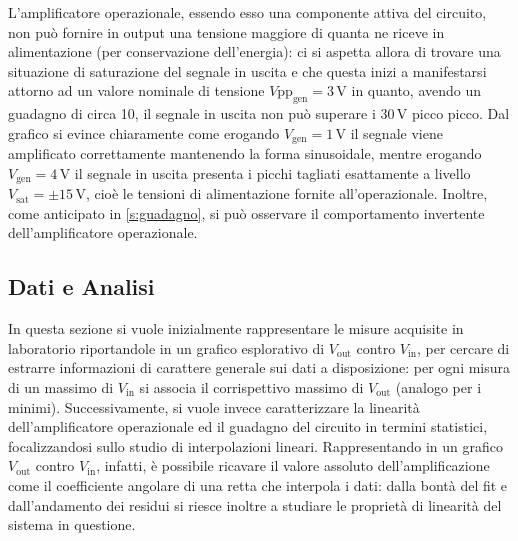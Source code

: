 \documentclass[a4paper,11pt]{article} %
\begin{document}
\noindent L'amplificatore operazionale, essendo esso una componente attiva del circuito, non può fornire in output una
tensione maggiore di quanta ne riceve in alimentazione (per conservazione dell'energia): ci si aspetta allora di trovare
una situazione di saturazione del segnale in uscita e che questa inizi a manifestarsi attorno ad un valore nominale di
tensione $V\text{pp}_{\text{gen}}=3\,\si{\volt}$ in quanto, avendo un guadagno di circa 10, il segnale in uscita non può
superare i $30\,\si{\volt}$ picco picco. Dal grafico si evince chiaramente come erogando $V_{\text{gen}}=1\,\si{\volt}$
il segnale viene amplificato correttamente mantenendo la forma sinusoidale, mentre erogando
$V_{\text{gen}}=4\,\si{\volt}$ il segnale in uscita presenta i picchi tagliati esattamente a livello $V_{\text{sat}}=\pm
15\,\si{\volt}$, cioè le tensioni di alimentazione fornite all'operazionale. Inoltre, come anticipato in
\autoref{s:guadagno}, si può osservare il comportamento invertente dell'amplificatore operazionale.



\subsection{Dati e Analisi}
In questa sezione si vuole inizialmente rappresentare le misure acquisite in laboratorio riportandole in un grafico
esplorativo di $V_{\text{out}}$ contro $V_{\text{in}}$, per cercare di estrarre informazioni di carattere generale sui
dati a disposizione: per ogni misura di un massimo di $V_{\text{in}}$ si associa il corrispettivo massimo di
$V_{\text{out}}$ (analogo per i minimi). Successivamente, si vuole invece caratterizzare la linearità dell'amplificatore
operazionale ed il guadagno del circuito in termini statistici, focalizzandosi sullo studio di interpolazioni lineari.
Rappresentando in un grafico $V_{\text{out}}$ contro $V_{\text{in}}$, infatti, è possibile ricavare il valore assoluto
dell'amplificazione come il coefficiente angolare di una retta che interpola i dati: dalla bontà del fit e
dall'andamento dei residui si riesce inoltre a studiare le proprietà di linearità del sistema in questione. 


\end{document}
